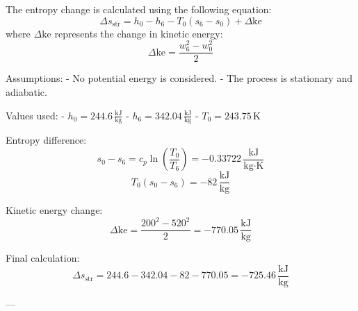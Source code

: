 The entropy change is calculated using the following equation:  
\[
\Delta s_{\text{str}} = h_0 - h_6 - T_0(s_6 - s_0) + \Delta \text{ke}
\]  
where \( \Delta \text{ke} \) represents the change in kinetic energy:  
\[
\Delta \text{ke} = \frac{w_6^2 - w_0^2}{2}
\]  

Assumptions:  
- No potential energy is considered.  
- The process is stationary and adiabatic.  

Values used:  
- \( h_0 = 244.6 \, \frac{\text{kJ}}{\text{kg}} \)  
- \( h_6 = 342.04 \, \frac{\text{kJ}}{\text{kg}} \)  
- \( T_0 = 243.75 \, \text{K} \)  

Entropy difference:  
\[
s_0 - s_6 = c_p \ln \left( \frac{T_0}{T_6} \right) = -0.33722 \, \frac{\text{kJ}}{\text{kg·K}}
\]  
\[
T_0(s_0 - s_6) = -82 \, \frac{\text{kJ}}{\text{kg}}
\]  

Kinetic energy change:  
\[
\Delta \text{ke} = \frac{200^2 - 520^2}{2} = -770.05 \, \frac{\text{kJ}}{\text{kg}}
\]  

Final calculation:  
\[
\Delta s_{\text{str}} = 244.6 - 342.04 - 82 - 770.05 = -725.46 \, \frac{\text{kJ}}{\text{kg}}
\]  

---